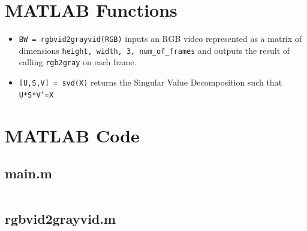 \documentclass{article}
\begin{document}
\printbibliography
\newpage
\begin{appendices}

\section{MATLAB Functions}

\begin{itemize}
    \item \texttt{BW = rgbvid2grayvid(RGB)} inputs an RGB video represented as a matrix of dimensions \texttt{height, width, 3, num\_of\_frames} and outputs the result of calling \texttt{rgb2gray} on each frame.
    
    \item \texttt{[U,S,V] = svd(X)} returns the Singular Value Decomposition such that \texttt{U*S*V'=X}
\end{itemize}

\section{MATLAB Code}

\subsection{main.m}
\inputminted{matlab}{main.m}

\subsection{rgbvid2grayvid.m}
\inputminted{matlab}{rgbvid2grayvid.m}
\end{appendices}
\end{document}
